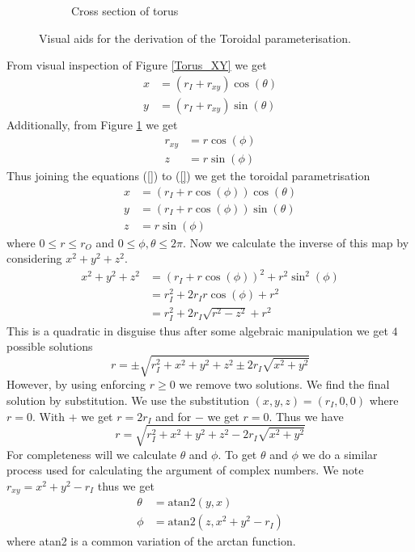 \documentclass[12pt]{ociamthesis}
\begin{document}
\begin{figure}[H]
\begin{subfigure}{0.5\textwidth}
     \caption{Cross section of torus}
     \label{Torus_z}
 \end{subfigure}
 \caption{Visual aids for the derivation of the Toroidal parameterisation.} \label{BO}
\end{figure}

From visual inspection of Figure \ref{Torus_XY} we get 
\begin{align}
x &= (r_I + r_{xy})\cos(\theta)\\
y &= (r_I + r_{xy})\sin(\theta)
\end{align}
Additionally, from Figure \ref{Torus_z} we get 
\begin{align}
r_{xy}& = r \cos(\phi) \\
z &= r \sin(\phi)
\end{align}
Thus joining the equations (\ref{}) to (\ref{}) we get the toroidal parametrisation
\begin{align}
x &= (r_I + r\cos(\phi))\cos(\theta) \\
y &= (r_I + r \cos(\phi))\sin(\theta) \\
z &= r \sin(\phi)
\end{align}
where $0\leq r \leq r_O$ and $0 \leq \phi, \theta \leq 2 \pi$. Now we calculate the inverse of this map by considering $x^2 + y^2 + z^2$. 
\begin{align}
x^2 + y^2 + z^2 &= (r_I + r \cos(\phi))^2 + r^2\sin^2(\phi)\\
&= r_I^2 + 2r_Ir\cos(\phi) + r^2\\
&= r_I^2 +2r_I \sqrt{r^2-z^2} + r^2
\end{align}
This is a quadratic in disguise thus after some algebraic manipulation we get $4$ possible solutions
\begin{equation}
r = \pm\sqrt{r_I^2 + x^2 + y^2 + z^2 \pm 2r_I\sqrt{x^2+y^2}}
\end{equation}
However, by using enforcing $r\geq0$ we remove two solutions. We find the final solution by substitution. We use the substitution $(x, y, z) = (r_I, 0, 0)$ where $r=0$. With $+$ we get $r=2r_I$ and for $-$ we get $r = 0$. Thus we have 
\begin{equation}
r = \sqrt{r_I^2 + x^2 + y^2 + z^2 - 2r_I\sqrt{x^2+y^2}}
\end{equation}
For completeness will we calculate $\theta$ and $\phi$. To get $\theta$ and $\phi$ we do a similar process used for calculating the argument of complex numbers. We note $r_{xy}=x^2+y^2-r_I$ thus we get
\begin{align}
\theta &= \text{atan2}(y, x) \\
\phi &= \text{atan2}(z, x^2+y^2-r_{I})
\end{align}
where atan2 is a common variation of the arctan function.
\end{document}
